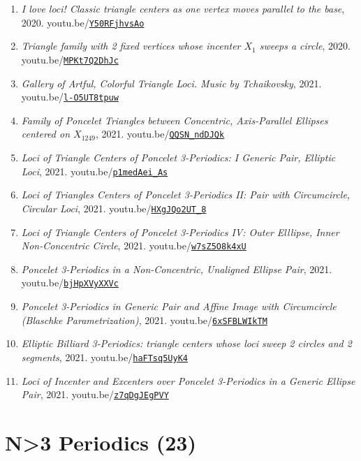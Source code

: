 \documentclass[12pt]{article}
\begin{document}
\begin{enumerate}[resume]
\item \textit{I love loci! Classic triangle centers as one vertex moves parallel to the base}, 2020. youtu.be/\href{https://youtu.be/Y50RFjhvsAo}{\nolinkurl{Y50RFjhvsAo}}
\item \textit{Triangle family with 2 fixed vertices whose incenter $X_{1}$ sweeps a circle}, 2020. youtu.be/\href{https://youtu.be/MPKt7Q2DhJc}{\nolinkurl{MPKt7Q2DhJc}}
\item \textit{Gallery of Artful, Colorful Triangle Loci. Music by Tchaikovsky}, 2021. youtu.be/\href{https://youtu.be/l-O5UT8tpuw}{\nolinkurl{l-O5UT8tpuw}}
\item \textit{Family of Poncelet Triangles between Concentric, Axis-Parallel Ellipses centered on $X_{1249}$}, 2021. youtu.be/\href{https://youtu.be/QQSN_ndDJQk}{\nolinkurl{QQSN\_ndDJQk}}
\item \textit{Loci of Triangle Centers of Poncelet 3-Periodics: 
I Generic Pair, Elliptic Loci}, 2021. youtu.be/\href{https://youtu.be/p1medAei_As}{\nolinkurl{p1medAei\_As}}
\item \textit{Loci of Triangles Centers of Poncelet 3-Periodics II: Pair with Circumcircle, Circular Loci}, 2021. youtu.be/\href{https://youtu.be/HXgJQo2UT_8}{\nolinkurl{HXgJQo2UT\_8}}
\item \textit{Loci of Triangle Centers of Poncelet 3-Periodics IV: Outer Elllipse, Inner Non-Concentric Circle}, 2021. youtu.be/\href{https://youtu.be/w7sZ5O8k4xU}{\nolinkurl{w7sZ5O8k4xU}}
\item \textit{Poncelet 3-Periodics in a Non-Concentric, Unaligned Ellipse Pair}, 2021. youtu.be/\href{https://youtu.be/bjHpXVyXXVc}{\nolinkurl{bjHpXVyXXVc}}
\item \textit{Poncelet 3-Periodics in Generic Pair and Affine Image with Circumcircle (Blaschke Parametrization)}, 2021. youtu.be/\href{https://youtu.be/6xSFBLWIkTM}{\nolinkurl{6xSFBLWIkTM}}
\item \textit{Elliptic Billiard 3-Periodics: triangle centers whose loci sweep 2 circles and 2 segments}, 2021. youtu.be/\href{https://youtu.be/haFTsq5UyK4}{\nolinkurl{haFTsq5UyK4}}
\item \textit{Loci of Incenter and Excenters over Poncelet 3-Periodics in a Generic Ellipse Pair}, 2021. youtu.be/\href{https://youtu.be/z7qDgJEgPVY}{\nolinkurl{z7qDgJEgPVY}}
\end{enumerate}

\section{N>3 Periodics (23)}
\end{document}
